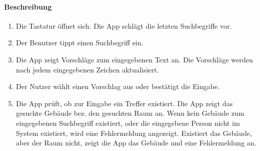 \paragraph{Beschreibung}
\begin{enumerate}
    \item Die Tastatur öffnet sich. Die App schlägt die letzten Suchbegriffe vor.
    \item Der Benutzer tippt einen Suchbegriff ein.
    \item Die App zeigt Vorschläge zum eingegebenen Text an. Die Vorschläge werden nach jedem eingegebenen Zeichen aktualisiert.
    \item Der Nutzer wählt einen Vorschlag aus oder bestätigt die Eingabe.
    \item Die App prüft, ob zur Eingabe ein Treffer existiert.
     Die App zeigt das gesuchte Gebäude bez. den gesuchten Raum an.
    \subsubitem Wenn kein Gebäude zum eingegebenen Suchbegriff existiert, oder die eingegebene Person nicht im System existiert, wird eine Fehlermeldung angezeigt.
    \subsubitem Existiert das Gebäude, aber der Raum nicht, zeigt die App das Gebäude und eine Fehlermeldung an.
\end{enumerate}
